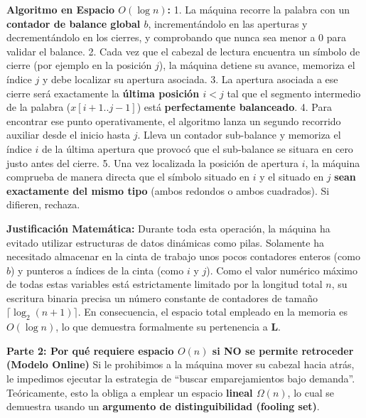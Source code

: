\documentclass[12pt]{book} %
\begin{document}
\textbf{Algoritmo en Espacio \(O(\log n)\):} 1. La máquina recorre la
palabra con un \textbf{contador de balance global \(b\)},
incrementándolo en las aperturas y decrementándolo en los cierres, y
comprobando que nunca sea menor a 0 para validar el balance. 2. Cada vez
que el cabezal de lectura encuentra un símbolo de cierre (por ejemplo en
la posición \(j\)), la máquina detiene su avance, memoriza el índice
\(j\) y debe localizar su apertura asociada. 3. La apertura asociada a
ese cierre será exactamente la \textbf{última posición \(i < j\)} tal
que el segmento intermedio de la palabra (\(x[i+1 .. j-1]\)) está
\textbf{perfectamente balanceado}. 4. Para encontrar ese punto
operativamente, el algoritmo lanza un segundo recorrido auxiliar desde
el inicio hasta \(j\). Lleva un contador sub-balance y memoriza el
índice \(i\) de la última apertura que provocó que el sub-balance se
situara en cero justo antes del cierre. 5. Una vez localizada la
posición de apertura \(i\), la máquina comprueba de manera directa que
el símbolo situado en \(i\) y el situado en \(j\) \textbf{sean
exactamente del mismo tipo} (ambos redondos o ambos cuadrados). Si
difieren, rechaza.

\textbf{Justificación Matemática:} Durante toda esta operación, la
máquina ha evitado utilizar estructuras de datos dinámicas como pilas.
Solamente ha necesitado almacenar en la cinta de trabajo unos pocos
contadores enteros (como \(b\)) y punteros a índices de la cinta (como
\(i\) y \(j\)). Como el valor numérico máximo de todas estas variables
está estrictamente limitado por la longitud total \(n\), su escritura
binaria precisa un número constante de contadores de tamaño
\(\lceil \log_2(n+1) \rceil\). En consecuencia, el espacio total
empleado en la memoria es \textbf{\(O(\log n)\)}, lo que demuestra
formalmente su pertenencia a \textbf{L}.

\textbf{Parte 2: Por qué requiere espacio \(O(n)\) si NO se permite
retroceder (Modelo Online)} Si le prohibimos a la máquina mover su
cabezal hacia atrás, le impedimos ejecutar la estrategia de ``buscar
emparejamientos bajo demanda''. Teóricamente, esto la obliga a emplear
un espacio \textbf{lineal \(\Omega(n)\)}, lo cual se demuestra usando un
\textbf{argumento de distinguibilidad (fooling set)}.
\end{document}

